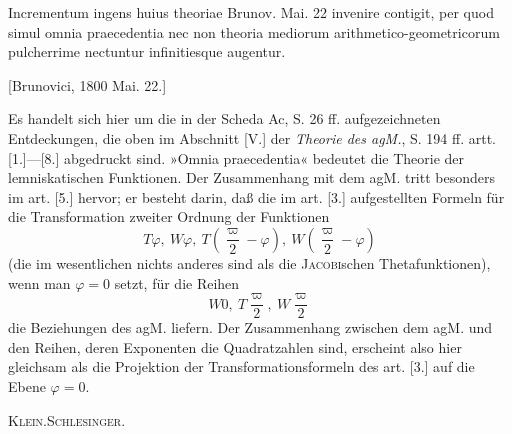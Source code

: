 \clearpage{}
\indent Incrementum ingens huius theoriae Brunov. Mai. 22 invenire contigit, per quod simul omnia praecedentia nec non theoria mediorum arithmetico-geometricorum pulcherrime nectuntur infinitiesque augentur.
\par\noindent\hfill[Brunovici, 1800 Mai. 22.]

\medskip\begingroup\small
\indent Es handelt sich hier um die in der Scheda Ac, S. 26 ff. aufgezeichneten Entdeckungen, die oben im Abschnitt [V.] der \textit{Theorie des agM.}, S. 194 ff. artt. [1.]—[8.] abgedruckt sind. »Omnia praecedentia« bedeutet die Theorie der lemniskatischen Funktionen. Der Zusammenhang mit dem agM. tritt besonders im art. [5.] hervor; er besteht darin, daß die im art. [3.] aufgestellten Formeln für die Transformation zweiter Ordnung der Funktionen
\[
T\varphi,\ W\varphi,\ T\left(\frac\varpi2-\varphi\right),\ W\left(\frac\varpi2-\varphi\right)
\]
\noindent (die im wesentlichen nichts anderes sind als die \textsc{Jacobi}schen Thetafunktionen), wenn man \(\varphi=0\) setzt, für die Reihen
\[
W0,\ T\frac\varpi2,\ W\frac\varpi2
\]
\noindent die Beziehungen des agM. liefern. Der Zusammenhang zwischen dem agM. und den Reihen, deren Exponenten die Quadratzahlen sind, erscheint also hier gleichsam als die Projektion der Transformationsformeln des art. [3.] auf die Ebene \(\varphi=0\).
\par\noindent\hfill\textsc{Klein.\quad Schlesinger.}
\par\endgroup
